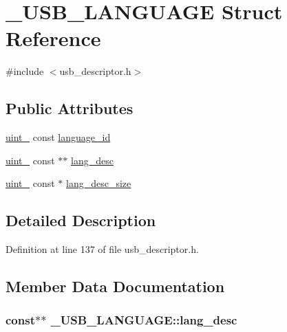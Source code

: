 \hypertarget{struct___u_s_b___l_a_n_g_u_a_g_e}{}\section{\+\_\+\+U\+S\+B\+\_\+\+L\+A\+N\+G\+U\+A\+GE Struct Reference}
\label{struct___u_s_b___l_a_n_g_u_a_g_e}


{\ttfamily \#include $<$usb\+\_\+descriptor.\+h$>$}

\subsection*{Public Attributes}
\begin{DoxyCompactItemize}
\item 
\hyperlink{types_8h_a8ab774e38493b7c7e4d8edfd5004e66b}{uint\+\_} const \hyperlink{struct___u_s_b___l_a_n_g_u_a_g_e_aa9c17ce22d359f944da36774d1808303}{language\+\_\+id}
\item 
\hyperlink{types_8h_ad3209046c23f739a81581c10a4be7d92}{uint\+\_} const $\ast$$\ast$ \hyperlink{struct___u_s_b___l_a_n_g_u_a_g_e_a9e65f8354fa94c1ef1dff859cc8816bd}{lang\+\_\+desc}
\item 
\hyperlink{types_8h_ad3209046c23f739a81581c10a4be7d92}{uint\+\_} const $\ast$ \hyperlink{struct___u_s_b___l_a_n_g_u_a_g_e_a77f740a8b24518a0a8345b3e8449a0a4}{lang\+\_\+desc\+\_\+size}
\end{DoxyCompactItemize}


\subsection{Detailed Description}


Definition at line 137 of file usb\+\_\+descriptor.\+h.



\subsection{Member Data Documentation}
\subsubsection[{\texorpdfstring{lang\+\_\+desc}{lang_desc}}]{ const$\ast$$\ast$ \+\_\+\+U\+S\+B\+\_\+\+L\+A\+N\+G\+U\+A\+G\+E\+::lang\+\_\+desc}\hypertarget{struct___u_s_b___l_a_n_g_u_a_g_e_a9e65f8354fa94c1ef1dff859cc8816bd}{}\label{struct___u_s_b___l_a_n_g_u_a_g_e_a9e65f8354fa94c1ef1dff859cc8816bd}


